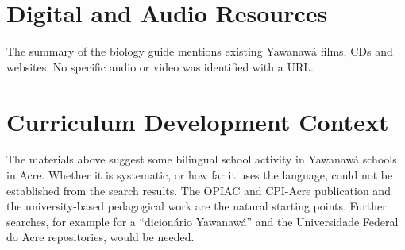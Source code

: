 \documentclass[12pt]{article}
\begin{document}
\section{Digital and Audio Resources}
The summary of the biology guide mentions existing Yawanawá films, CDs and websites. No specific audio or video was identified with a URL.

\section{Curriculum Development Context}
The materials above suggest some bilingual school activity in Yawanawá schools in Acre. Whether it is systematic, or how far it uses the language, could not be established from the search results. The OPIAC and CPI-Acre publication and the university-based pedagogical work are the natural starting points. Further searches, for example for a ``dicionário Yawanawá'' and the Universidade Federal do Acre repositories, would be needed.
\end{document}
